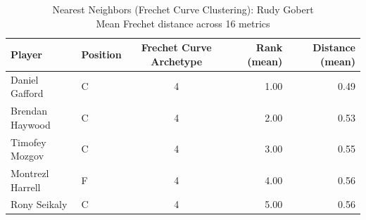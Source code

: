 \begin{table}[t]
\caption*{
{\fontsize{20}{25} Nearest Neighbors (Frechet Curve Clustering): Rudy Gobert\fontsize{12}{15}\selectfont } \\ 
{\fontsize{14}{17}\selectfont  Mean Frechet distance across 16 metrics\fontsize{12}{15}\selectfont }
} 
\fontsize{12.0pt}{14.0pt}\selectfont
\begin{tabular*}{\linewidth}{@{\extracolsep{\fill}}llcrr}
\toprule
Player & Position & Frechet Curve Archetype & Rank (mean) & Distance (mean) \\ 
\midrule\addlinespace[2.5pt]
Daniel Gafford & C & 4 & 1.00 & 0.49 \\ 
Brendan Haywood & C & 4 & 2.00 & 0.53 \\ 
Timofey Mozgov & C & 4 & 3.00 & 0.55 \\ 
Montrezl Harrell & F & 4 & 4.00 & 0.56 \\ 
Rony Seikaly & C & 4 & 5.00 & 0.56 \\ 
\bottomrule
\end{tabular*}
\end{table}

